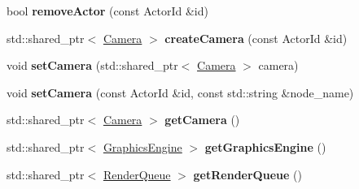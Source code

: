 \begin{DoxyCompactItemize}
\item 
\mbox{\label{classTarbora_1_1Scene_ab77e1789b4ec63ddfb92ea27e1a3226d}} 
bool {\bfseries remove\+Actor} (const Actor\+Id \&id)
\item 
\mbox{\label{classTarbora_1_1Scene_acd947aa93300b30329f3b6bd3c42f55e}} 
std\+::shared\+\_\+ptr$<$ \hyperlink{classTarbora_1_1Camera}{Camera} $>$ {\bfseries create\+Camera} (const Actor\+Id \&id)
\item 
\mbox{\label{classTarbora_1_1Scene_ab03594b675d2de8285c1ce778abb406c}} 
void {\bfseries set\+Camera} (std\+::shared\+\_\+ptr$<$ \hyperlink{classTarbora_1_1Camera}{Camera} $>$ camera)
\item 
\mbox{\label{classTarbora_1_1Scene_a987535c22647c79b1e0c1b0113651b1a}} 
void {\bfseries set\+Camera} (const Actor\+Id \&id, const std\+::string \&node\+\_\+name)
\item 
\mbox{\label{classTarbora_1_1Scene_a380d02299c24b970a66b726adba2bf78}} 
std\+::shared\+\_\+ptr$<$ \hyperlink{classTarbora_1_1Camera}{Camera} $>$ {\bfseries get\+Camera} ()
\item 
\mbox{\label{classTarbora_1_1Scene_af222e7b73eadae7e752f77d02e311f02}} 
std\+::shared\+\_\+ptr$<$ \hyperlink{classTarbora_1_1GraphicsEngine}{Graphics\+Engine} $>$ {\bfseries get\+Graphics\+Engine} ()
\item 
\mbox{\label{classTarbora_1_1Scene_a09ca9ea3b41f24d7f4827c5f35f1a065}} 
std\+::shared\+\_\+ptr$<$ \hyperlink{classTarbora_1_1RenderQueue}{Render\+Queue} $>$ {\bfseries get\+Render\+Queue} ()
\end{DoxyCompactItemize}
